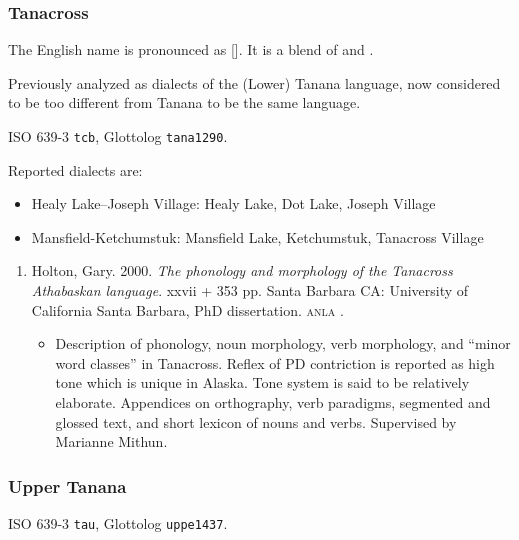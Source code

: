 \documentclass[12pt,letterpaper,oneside,article]{memoir}
\begin{document}
\subsubsection{Tanacross}\label{sec:tanacross}

The English name  is pronounced as [].
It is a blend of  and .

Previously analyzed as dialects of the (Lower) Tanana language, now considered to be too different from Tanana to be the same language.

ISO 639-3 \texttt{tcb}, Glottolog \texttt{tana1290}.

Reported dialects are:
\begin{itemize}
\item	Healy Lake–Joseph Village: Healy Lake, Dot Lake, Joseph Village
\item	Mansfield-Ketchumstuk: Mansfield Lake, Ketchumstuk, Tanacross Village
\end{itemize}

\begin{enumerate}
\item	Holton, Gary.
	2000.
	\textit{The phonology and morphology of the Tanacross Athabaskan language}.
	xxvii + 353 pp.
	Santa Barbara CA: University of California Santa Barbara, PhD dissertation.
	\textsc{anla} .
	\begin{itemize}
	\item	Description of phonology, noun morphology, verb morphology, and
		“minor word classes” in Tanacross.
		Reflex of PD contriction is reported as high tone which is unique in Alaska.
		Tone system is said to be relatively elaborate.
		Appendices on orthography, verb paradigms, segmented and glossed text,
		and short lexicon of nouns and verbs.
		Supervised by Marianne Mithun.
	\end{itemize}
\end{enumerate}

\subsubsection{Upper Tanana}\label{sec:utanana}

ISO 639-3 \texttt{tau}, Glottolog \texttt{uppe1437}.
\end{document}
